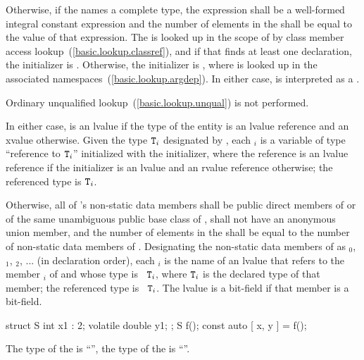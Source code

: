 \pnum
Otherwise, if
the  
names a complete type,
the expression 
shall be a well-formed integral constant expression
and
the number of elements in
the  shall be equal to the value of that
expression. The   is looked up
in the scope of  by class member access lookup~(\ref{basic.lookup.classref}),
and if that finds at least one declaration, the initializer is
. Otherwise, the initializer is ,
where  is looked up in the associated namespaces~(\ref{basic.lookup.argdep}).
In either case,  is interpreted as a .
\begin{note}
Ordinary unqualified lookup~(\ref{basic.lookup.unqual}) is not performed.
\end{note}
In either case,  is an lvalue if the type of the entity 
is an lvalue reference and an xvalue otherwise. Given the type $\texttt{T}_i$
designated by , each $_i$
is a variable of type ``reference to $\texttt{T}_i$'' initialized with the
initializer, where the reference is an lvalue reference if the initializer is
an lvalue and an rvalue reference otherwise; the referenced type is $\texttt{T}_i$.

\pnum
Otherwise, all of 's non-static data members shall be public direct
members of  or of the same unambiguous public base class of ,
 shall not have an anonymous union member, and the number of elements
in the  shall be equal to the number of non-static
data members of .
Designating the non-static data members of  as
$_0$, $_1$, $_2$, ...
(in declaration order),
each $_i$ is the
name of an lvalue that refers to the member $_i$ of  and
whose type is \cv{}~$\texttt{T}_i$, where $\texttt{T}_i$ is the declared type of
that member; the referenced type is \cv{}~$\texttt{T}_i$. The lvalue is a
bit-field if that member is a bit-field.
\begin{example}
\begin{codeblock}
struct S { int x1 : 2; volatile double y1; };
S f();
const auto [ x, y ] = f();
\end{codeblock}
The type of the   is ``'',
the type of the   is ``''.
\end{example}

